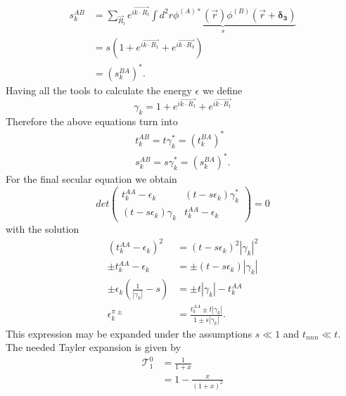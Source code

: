 		\begin{equation}
			\begin{split}
				s_k^{AB} &= \sum_{\vec R_l} e^{i \vec{k \cdot R_l}} \underbrace{\int d^2 r \phi^{(A)*}(\vec{r}) \phi^{(B)}(\vec{r} + \boldsymbol{\delta_3})}_{s} \\
				&= s(1 + e^{i \vec{k \cdot R_1}} + e^{i \vec{k \cdot R_3}})	\\
				&= (s_k^{BA})^*.			
			\end{split}
		\end{equation}
		Having all the tools to calculate the energy $\epsilon$ we define 
		\begin{equation}
			\gamma_k = 1 + e^{i \vec{k \cdot R_1}} + e^{i \vec{k \cdot R_1}} 
		\end{equation}
		Therefore the above equations  turn into
		\begin{align}
			t_k^{AB} = t \gamma_k^* = (t_k^{BA})^* \\
			s_k^{AB} = s \gamma_k^* = (s_k^{BA})^*.
		\end{align}
		For the final secular equation we obtain
		\begin{equation}
			det
			\begin{pmatrix}
				t_k^{AA} - \epsilon_k & (t - s\epsilon_k)\gamma_k^* \\
				(t - s\epsilon_k)\gamma_k & t_k^{AA} - \epsilon_k
			\end{pmatrix}
			= 0
		\end{equation}
		with the solution
		\begin{equation}
			\label{eq:tightEnergyFrac}
			\begin{split}
				(t_k^{AA} - \epsilon_k)^2 &= (t - s \epsilon_k)^2|\gamma_k|^2 \\
				\pm t_k^{AA} - \epsilon_k &= \pm (t - s \epsilon_k)|\gamma_k| \\
				\pm \epsilon_k (\frac{1}{|\gamma_k|} - s)&= \pm t|\gamma_k| - t_k^{AA} \\
				\epsilon_k^{\pi \pm} &= \frac{t_k^{AA} \pm t|\gamma_k|}{1 \pm s|\gamma_k|}.
			\end{split}
		\end{equation}
		This expression may be expanded under the assumptions $s \ll 1$ and $t_{nnn} \ll t$. The needed Tayler expansion is given by
		\begin{equation}
			\begin{split}
				\mathcal{T}_1^0 &= \frac{1}{1+x} \\
				&= 1 - \frac{x}{(1+x)^2} 
			\end{split}	
		\end{equation}
